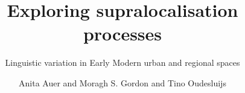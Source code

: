 \title{Exploring supralocalisation processes}
\subtitle{Linguistic variation in Early Modern urban and regional spaces }
\author{Anita Auer and Moragh S. Gordon and Tino Oudesluijs}


\lsCoverTitleSizes{48pt}{16mm}%

\renewcommand{\lsSeries}{ahl}
\renewcommand{\lsSeriesNumber}{}

